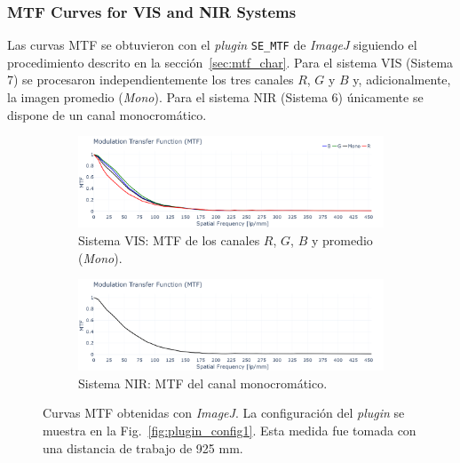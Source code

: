     \subsubsection{MTF Curves for VIS and NIR Systems}
    \label{subsub:mtf_curves}
    Las curvas MTF se obtuvieron con el \textit{plugin} \texttt{SE\_MTF} de \textit{ImageJ} siguiendo el procedimiento descrito en la sección~\ref{sec:mtf_char}.  
    Para el sistema VIS (Sistema 7) se procesaron independientemente los tres canales \(R\), \(G\) y \(B\) y, adicionalmente, la imagen promedio (\textit{Mono}).  
    Para el sistema NIR (Sistema 6) únicamente se dispone de un canal monocromático.

    \begin{figure}[H]
        \centering
        \begin{subfigure}[b]{0.95\linewidth}
            \centering
            \includegraphics[width=\linewidth]{Figures/C4/mtf_vis.png}
            \caption{Sistema VIS: MTF de los canales \(R\), \(G\), \(B\) y promedio (\textit{Mono}).}
            \label{fig:mtf_vis}
        \end{subfigure}
        \hfill
        \begin{subfigure}[b]{0.95\linewidth}
            \centering
            \includegraphics[width=\linewidth]{Figures/C4/mtf_nir.png}
            \caption{Sistema NIR: MTF del canal monocromático.}
            \label{fig:mtf_nir}
        \end{subfigure}
        \caption{Curvas MTF obtenidas con \textit{ImageJ}.  
                La configuración del \textit{plugin} se muestra en la Fig.~\ref{fig:plugin_config1}. Esta medida fue tomada con una distancia de trabajo de 925 mm.}
        \label{fig:mtf_curves}
    \end{figure}

